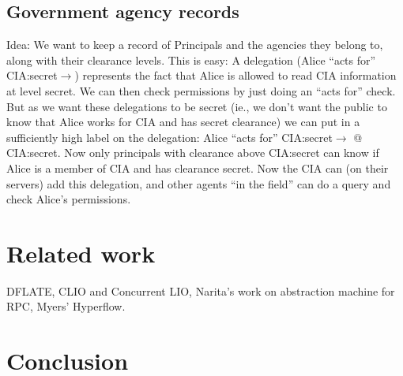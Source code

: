\documentclass[conference]{IEEEtran}
\begin{document}
\subsection{Government agency records}
Idea: We want to keep a record of Principals and the agencies they belong to, along with their clearance levels. This is easy: A delegation (Alice ``acts for'' CIA:secret$\rightarrow$) represents the fact that Alice is allowed to read CIA information at level secret. We can then check permissions by just doing an ``acts for'' check. But as we want these delegations to be secret (ie., we don't want the public to know that Alice works for CIA and has secret clearance) we can put in a sufficiently high label on the delegation:
Alice ``acts for'' CIA:secret$\rightarrow$ @ CIA:secret. Now only principals with clearance above CIA:secret can know if Alice is a member of CIA and has clearance secret.
Now the CIA can (on their servers) add this delegation, and other agents ``in the field'' can do a query and check Alice's permissions.

\section{Related work}
DFLATE, CLIO and Concurrent LIO, Narita's work on abstraction machine for RPC, Myers' Hyperflow.

\section{Conclusion}




\vspace{12pt}
\end{document}
